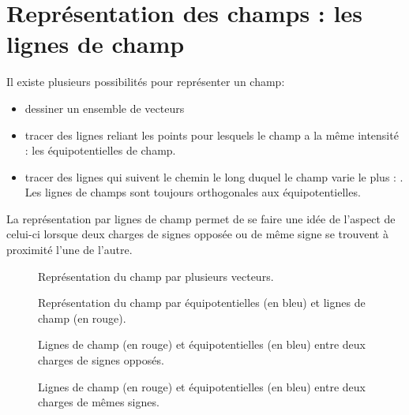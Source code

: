 \newpage

\section{Représentation des champs : les lignes de champ}
Il existe plusieurs possibilités pour représenter un champ:
\begin{itemize}[label=\textbullet]
    \item dessiner un ensemble de vecteurs
    \item tracer des lignes reliant les points pour lesquels le champ a la même intensité : les équipotentielles de champ.
    \item tracer des lignes qui suivent le chemin le long duquel le champ varie le plus : . Les lignes de champs sont toujours orthogonales aux équipotentielles.
\end{itemize}
La représentation par lignes de champ permet de se faire une idée de l'aspect de celui-ci lorsque deux charges de signes opposée ou de même signe se trouvent à proximité l'une de l'autre.

\newpage

\begin{figure}[!ht]
    \centering
    \resizebox{.6\linewidth}{!}{}
    \caption{Représentation du champ par plusieurs vecteurs.}
    \label{vecteurs_champ}
\end{figure}

\begin{figure}[!ht]
    \centering
    \resizebox{.6\linewidth}{!}{}
    \caption{Représentation du champ par équipotentielles (en bleu) et lignes de champ (en rouge).}
    \label{equipotentielle}
\end{figure}

\newpage

\begin{figure}[!ht]
    \centering
    \begin{minipage}[b]{.4\linewidth}
        \centering
        \caption{Lignes de champ (en rouge) et équipotentielles (en bleu) entre deux charges de signes opposés.}
        \label{champ_pos_neg}
    \end{minipage}
    \begin{minipage}[b]{.4\linewidth}
        \centering
        \caption{Lignes de champ (en rouge) et équipotentielles (en bleu) entre deux charges de mêmes signes.}
        \label{champ_pos_pos}
    \end{minipage}
\end{figure}



